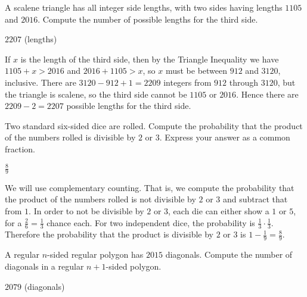 \documentclass[11pt]{article}
\begin{document}
\begin{problem}
A scalene triangle has all integer side lengths, with two sides having lengths $1105$ and $2016$. Compute the number of possible lengths for the third side.
\end{problem}

\begin{answer}
$\boxed{2207}$ (lengths)
\end{answer}

\begin{solution}
If $x$ is the length of the third side, then by the Triangle Inequality we have $1105 + x > 2016$ and $2016 + 1105 > x$, so $x$ must be between $912$ and $3120$, inclusive. There are $3120 - 912 + 1 = 2209$ integers from $912$ through $3120$, but the triangle is scalene, so the third side cannot be $1105$ or $2016$. Hence there are $2209 - 2 = \boxed{2207}$ possible lengths for the third side.
\end{solution}


\begin{problem}
Two standard six-sided dice are rolled. Compute the probability that the product of the numbers rolled is divisible by $2$ or $3$. Express your answer as a common fraction.
\end{problem}

\begin{answer} %
$\boxed{\frac{8}{9}}$
\end{answer}

\begin{solution}
We will use complementary counting. That is, we compute the probability that the product of the numbers rolled is not divisible by $2$ or $3$ and subtract that from $1$. In order to not be divisible by $2$ or $3$, each die can either show a $1$ or $5$, for a $\frac{2}{6} = \frac{1}{3}$ chance each. For two independent dice, the probability is $\frac{1}{3} \cdot \frac{1}{3}$. Therefore the probability that the product is divisible by $2$ or $3$ is $1 - \frac{1}{9} = \boxed{\frac{8}{9}}$.
\end{solution}


\begin{problem}
A regular $n$-sided regular polygon has $2015$ diagonals. Compute the number of diagonals in a regular $n+1$-sided polygon.
\end{problem}

\begin{answer}
$\boxed{2079}$ (diagonals)
\end{answer}
\end{document}

